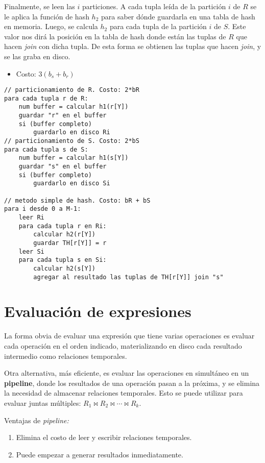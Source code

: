 \documentclass[a4paper, twoside]{article}
\begin{document}
\begin{itemize}
	Finalmente, se leen las $i$ particiones. A cada tupla leída de la partición $i$ de $R$ se le aplica la función de hash $h_{2}$ para saber dónde guardarla en una tabla de hash en memoria. Luego, se calcula $h_{2}$ para cada tupla de la partición $i$ de $S$. Este valor nos dirá la posición en la tabla de hash donde están las tuplas de $R$ que hacen \emph{join} con dicha tupla. De esta forma se obtienen las tuplas que hacen \emph{join}, y se las graba en disco.
	\begin{itemize}
		\item Costo: $3\left(b_{s}+b_{r}\right)$
	\end{itemize}

	\begin{lstlisting}
// particionamiento de R. Costo: 2*bR
para cada tupla r de R:
	num buffer = calcular h1(r[Y])
	guardar "r" en el buffer
	si (buffer completo)
		guardarlo en disco Ri
// particionamiento de S. Costo: 2*bS
para cada tupla s de S:
	num buffer = calcular h1(s[Y])
	guardar "s" en el buffer
	si (buffer completo)
		guardarlo en disco Si

// metodo simple de hash. Costo: bR + bS
para i desde 0 a M-1:
	leer Ri
	para cada tupla r en Ri:
		calcular h2(r[Y])
		guardar TH[r[Y]] = r
	leer Si
	para cada tupla s en Si:
		calcular h2(s[Y])
		agregar al resultado las tuplas de TH[r[Y]] join "s"
	\end{lstlisting}
\end{itemize}

\section{Evaluación de expresiones}
La forma obvia de evaluar una expresión que tiene varias operaciones es evaluar cada operación en el orden indicado, materializando en disco cada resultado intermedio como relaciones temporales.

Otra alternativa, más eficiente, es evaluar las operaciones en simultáneo en un \textbf{pipeline}, donde los resultados de una operación pasan a la próxima, y se elimina la necesidad de almacenar relaciones temporales. Esto se puede utilizar para evaluar juntas múltiples: $R_{1}\bowtie R_{2}\bowtie\cdots\bowtie R_{k}$.

Ventajas de \emph{pipeline:}
\begin{enumerate}
	\item Elimina el costo de leer y escribir relaciones temporales.
	\item Puede empezar a generar resultados inmediatamente.
\end{enumerate}
\end{document}
